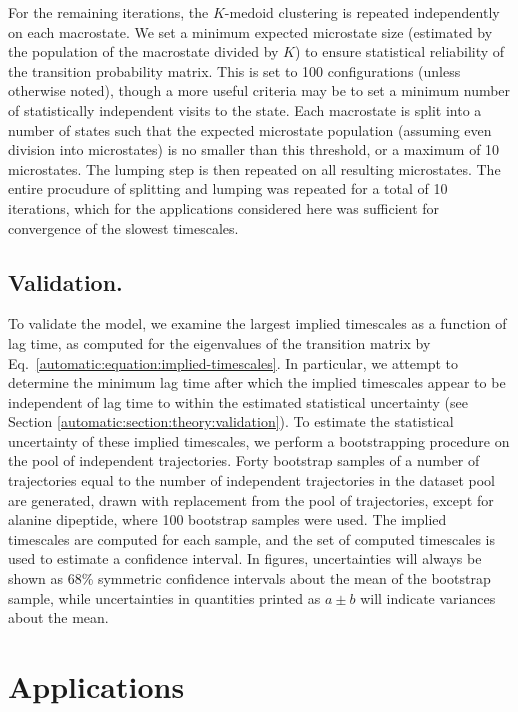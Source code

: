 For the remaining iterations, the $K$-medoid clustering is repeated independently on each macrostate.
We set a minimum expected microstate size (estimated by the population of the macrostate divided by $K$) to ensure statistical reliability of the transition probability matrix.
This is set to 100 configurations (unless otherwise noted), though a more useful criteria may be to set a minimum number of statistically independent visits to the state.
Each macrostate is split into a number of states such that the expected microstate population (assuming even division into microstates) is no smaller than this threshold, or a maximum of 10 microstates.
The lumping step is then repeated on all resulting microstates.
The entire procudure of splitting and lumping was repeated for a total of 10 iterations, which for the applications considered here was sufficient for convergence of the slowest timescales.

\subsection{Validation.}
\label{automatic:section:methods:validation}

To validate the model, we examine the largest implied timescales as a function of lag time, as computed for the eigenvalues of the transition matrix by Eq.\ \ref{automatic:equation:implied-timescales}.
In particular, we attempt to determine the minimum lag time after which the implied timescales appear to be independent of lag time to within the estimated statistical uncertainty (see Section \ref{automatic:section:theory:validation}).
To estimate the statistical uncertainty of these implied timescales, we perform a bootstrapping procedure \cite{efron:1979a} on the pool of independent trajectories.
Forty bootstrap samples of a number of trajectories equal to the number of independent trajectories in the dataset pool are generated, drawn with replacement from the pool of trajectories, except for alanine dipeptide, where 100 bootstrap samples were used.
The implied timescales are computed for each sample, and the set of computed timescales is used to estimate a confidence interval.
In figures, uncertainties will always be shown as 68\% symmetric confidence intervals about the mean of the bootstrap sample, while uncertainties in quantities printed as $a \pm b$ will indicate variances about the mean.

\section{Applications}
\label{automatic:section:applications}

